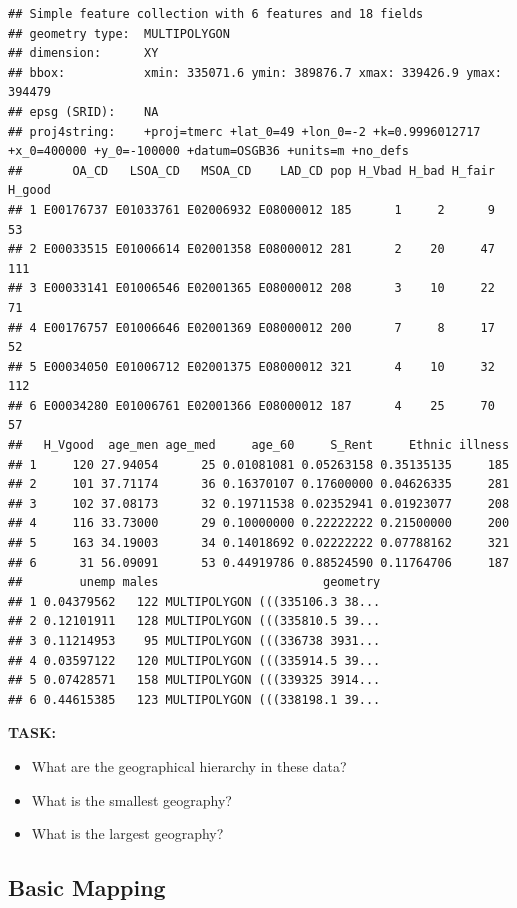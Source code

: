 \documentclass[]{book}
\providecommand{\tightlist}{%
  \setlength{\itemsep}{0pt}\setlength{\parskip}{0pt}}
\begin{document}
\begin{verbatim}
## Simple feature collection with 6 features and 18 fields
## geometry type:  MULTIPOLYGON
## dimension:      XY
## bbox:           xmin: 335071.6 ymin: 389876.7 xmax: 339426.9 ymax: 394479
## epsg (SRID):    NA
## proj4string:    +proj=tmerc +lat_0=49 +lon_0=-2 +k=0.9996012717 +x_0=400000 +y_0=-100000 +datum=OSGB36 +units=m +no_defs
##       OA_CD   LSOA_CD   MSOA_CD    LAD_CD pop H_Vbad H_bad H_fair H_good
## 1 E00176737 E01033761 E02006932 E08000012 185      1     2      9     53
## 2 E00033515 E01006614 E02001358 E08000012 281      2    20     47    111
## 3 E00033141 E01006546 E02001365 E08000012 208      3    10     22     71
## 4 E00176757 E01006646 E02001369 E08000012 200      7     8     17     52
## 5 E00034050 E01006712 E02001375 E08000012 321      4    10     32    112
## 6 E00034280 E01006761 E02001366 E08000012 187      4    25     70     57
##   H_Vgood  age_men age_med     age_60     S_Rent     Ethnic illness
## 1     120 27.94054      25 0.01081081 0.05263158 0.35135135     185
## 2     101 37.71174      36 0.16370107 0.17600000 0.04626335     281
## 3     102 37.08173      32 0.19711538 0.02352941 0.01923077     208
## 4     116 33.73000      29 0.10000000 0.22222222 0.21500000     200
## 5     163 34.19003      34 0.14018692 0.02222222 0.07788162     321
## 6      31 56.09091      53 0.44919786 0.88524590 0.11764706     187
##        unemp males                       geometry
## 1 0.04379562   122 MULTIPOLYGON (((335106.3 38...
## 2 0.12101911   128 MULTIPOLYGON (((335810.5 39...
## 3 0.11214953    95 MULTIPOLYGON (((336738 3931...
## 4 0.03597122   120 MULTIPOLYGON (((335914.5 39...
## 5 0.07428571   158 MULTIPOLYGON (((339325 3914...
## 6 0.44615385   123 MULTIPOLYGON (((338198.1 39...
\end{verbatim}

\textbf{TASK:}

\begin{itemize}
\tightlist
\item
  What are the geographical hierarchy in these data?
\item
  What is the smallest geography?
\item
  What is the largest geography?
\end{itemize}

\hypertarget{basic-mapping}{%
\subsection{Basic Mapping}\label{basic-mapping}}
\end{document}
